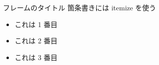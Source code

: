 \begin{frame}{フレームのタイトル}
  箇条書きには itemize を使う
  
  \begin{itemize}
  \item これは 1 番目
  \item これは 2 番目
  \item これは 3 番目
  \end{itemize}
\end{frame}

